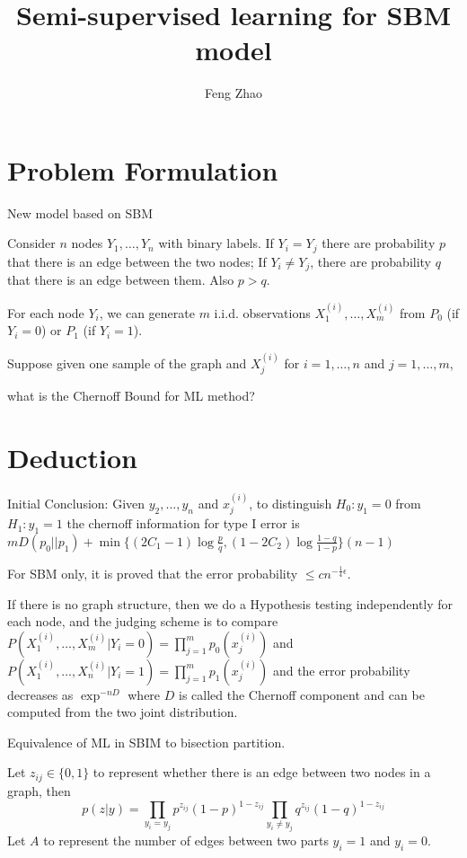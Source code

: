 \documentclass{article}
\title{Semi-supervised learning for SBM model}
\author{Feng Zhao}
\begin{document}
	\maketitle
\section{Problem Formulation}
New model based on SBM

Consider $n$ nodes $Y_1, \dots, Y_n$ with binary labels. If  $Y_i  = Y_j$ there are probability $p$ that there is an edge between the two nodes; If $Y_i \neq Y_j$, there are probability $q$ that there is an edge between them. Also $p>q$.

For each node $Y_i$, we can generate $m$ i.i.d. observations $X_1^{(i)}, \dots, X_m^{(i)}$ from $P_0$ (if $Y_i = 0$) or $P_1$ (if $Y_i=1$).

Suppose given one sample of the graph and $X_j^{(i)}$ for $i=1, \dots, n$ and $j=1, \dots, m$,

what is the Chernoff Bound for ML method?

\section{Deduction}
Initial Conclusion: Given $y_2, \dots, y_n$ and $x^{(i)}_{j}$, to distinguish $H_0: y_1 = 0 $ from $H_1: y_1 =1 $ the chernoff information
for type I error is $mD(p_0||p_1)+ \min \{(2C_1 - 1)\log\frac{p}{q}, (1-2C_2)\log\frac{1-q}{1-p}\} (n-1)$ 

For SBM only, it is proved that the error probability $\leq cn^{-\frac{1}{4}\epsilon}$\cite{abbe15}.

If there is no graph structure, then we do a Hypothesis testing independently for each node, and the judging scheme is to compare $P(X^{(i)}_1, \dots, X^{(i)}_m | Y_i=0)=\prod_{j=1}^m p_0(x^{(i)}_j)$ and $P(X^{(i)}_1, \dots, X^{(i)}_n | Y_i=1) = \prod_{j=1}^m p_1(x_j^{(i)})$ and the error probability decreases as $\exp^{-n D}$ where $D$ is called the Chernoff component and can be computed from the two joint distribution.

Equivalence of ML in SBIM to bisection partition.

Let $z_{ij} \in \{0, 1\}$ to represent whether there is an edge between two nodes in a graph, then
$$
p(z | y) = \prod_{y_i = y_j} p^{z_{ij}} (1-p)^{1-z_{ij}} \prod_{y_i \neq y_j} q^{z_{ij}}(1-q)^{1-z_{ij}}
$$
Let $A$ to represent the number of edges between two parts $y_i=1$ and $y_i=0$.
\end{document}
